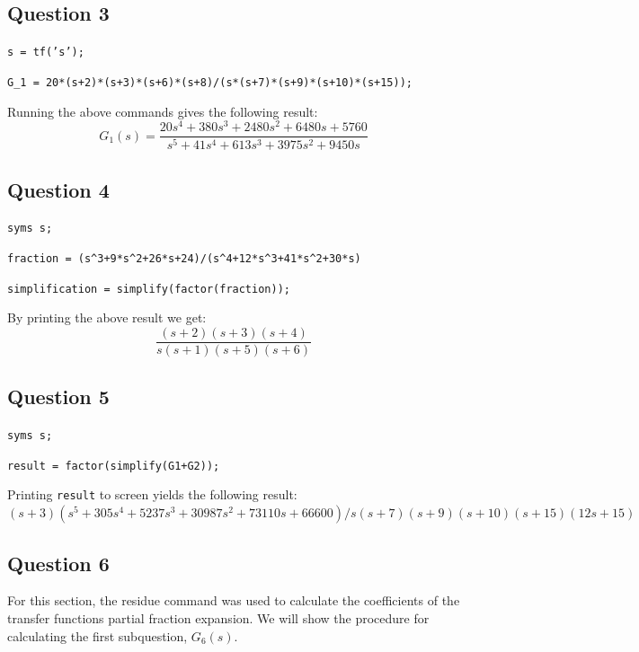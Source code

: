 \documentclass[12pt, a4paper]{article}
\begin{document}

		\subsection*{Question 3} %
		\label{sub:question_3}
			\texttt{s = tf('s');} \par\noindent
			\texttt{G\_1 = 20*(s+2)*(s+3)*(s+6)*(s+8)/(s*(s+7)*(s+9)*(s+10)*(s+15));}

			\noindent Running the above commands gives the following result:
			\[
				G_1(s) = \frac{20 s^4 + 380 s^3 + 2480 s^2 + 6480 s + 5760}{s^5 + 41 s^4 + 613 s^3 + 3975 s^2 + 9450 s}
			\]


		\subsection*{Question 4} %
		\label{sub:question_4}
		\texttt{syms s;}\par\noindent
		\texttt{fraction = (s\^{}3+9*s\^{}2+26*s+24)/(s\^{}4+12*s\^{}3+41*s\^{}2+30*s)}\par\noindent
		\texttt{simplification = simplify(factor(fraction));}\par\noindent
		
		By printing the above result we get:
		\[
			\frac{(s+2)(s+3)(s+4)}{s(s+1)(s+5)(s+6)}
		\]



		\subsection*	{Question 5}
		\label{sub:question_5}
			\texttt{syms s;}\par\noindent
			\texttt{result = factor(simplify(G1+G2));}\\\par\noindent
			Printing \texttt{result} to screen yields the following result:
				$(s+3)(s^5+305s^4+5237s^3+30987s^2+73110s+66600)/s(s+7)(s+9)(s+10)(s+15)(12s+15)$

		\subsection*{Question 6} %
		\label{sub:question_6}
			For this section, the residue command was used to calculate the coefficients of the transfer functions partial fraction expansion. We will show the procedure for calculating the first subquestion, $G_6(s)$.
\end{document}
